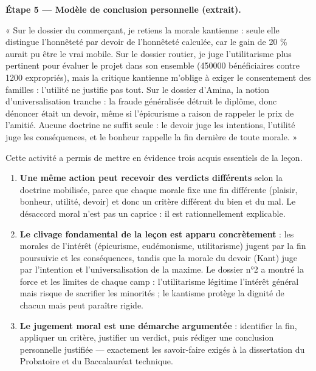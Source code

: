 \documentclass[11pt]{article}
\newcommand{\cle}[1]{{\popxbold\color{popdark}#1}}
\newcounter{popsec}
\newcounter{popsub}
\newcommand{\courssub}[1]{%
  \stepcounter{popsub}%
  \par\vspace{9pt}\noindent{\popxbold\fontsize{11.5}{13}\selectfont\color{popink}{\color{poporange}\thepopsec.\thepopsub}\hspace{6pt}#1}\par\nopagebreak\vspace{4pt}
}
\begin{document}
\begin{exoresolu}
\textbf{Étape 5 — Modèle de conclusion personnelle (extrait).}

« Sur le dossier du commerçant, je retiens la morale kantienne : seule elle distingue l'honnêteté par devoir de l'honnêteté calculée, car le gain de 20 \% aurait pu être le vrai mobile. Sur le dossier routier, je juge l'utilitarisme plus pertinent pour évaluer le projet dans son ensemble (\num{450000} bénéficiaires contre \num{1200} expropriés), mais la critique kantienne m'oblige à exiger le consentement des familles : l'\cle{utilité} ne justifie pas tout. Sur le dossier d'Amina, la notion d'\cle{universalisation} tranche : la fraude généralisée détruit le diplôme, donc dénoncer était un \cle{devoir}, même si l'épicurisme a raison de rappeler le prix de l'amitié. Aucune doctrine ne suffit seule : le devoir juge les intentions, l'utilité juge les conséquences, et le \cle{bonheur} rappelle la fin dernière de toute morale. »
\end{exoresolu}

\courssub{Bilan de l'activité}

Cette activité a permis de mettre en évidence trois acquis essentiels de la leçon.

\begin{enumerate}
\item \textbf{Une même action peut recevoir des verdicts différents} selon la doctrine mobilisée, parce que chaque morale fixe une \cle{fin} différente (plaisir, bonheur, utilité, devoir) et donc un critère différent du bien et du mal. Le désaccord moral n'est pas un caprice : il est rationnellement explicable.
\item \textbf{Le clivage fondamental de la leçon est apparu concrètement} : les morales de l'\cle{intérêt} (épicurisme, eudémonisme, utilitarisme) jugent par la fin poursuivie et les conséquences, tandis que la morale du \cle{devoir} (Kant) juge par l'intention et l'universalisation de la maxime. Le dossier n°2 a montré la force et les limites de chaque camp : l'utilitarisme légitime l'intérêt général mais risque de sacrifier les minorités ; le kantisme protège la dignité de chacun mais peut paraître rigide.
\item \textbf{Le jugement moral est une démarche argumentée} : identifier la fin, appliquer un critère, justifier un verdict, puis rédiger une conclusion personnelle justifiée — exactement les savoir-faire exigés à la dissertation du Probatoire et du Baccalauréat technique.
\end{enumerate}
\end{document}
